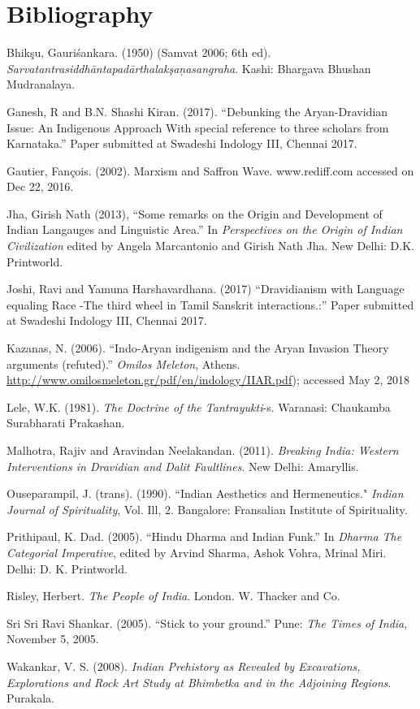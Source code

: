 \section*{Bibliography}

\begin{thebibliography}{99}
\itemsep=0pt
 Bhikşu, Gauriśankara. (1950) (Samvat 2006; 6th ed). \textit{Sarvatantrasiddhāntapadārthalakşaņasangraha}. Kashi: Bhargava Bhushan Mudranalaya.

  Ganesh, R and B.N. Shashi Kiran. (2017). “Debunking the Aryan-Dravidian Issue: An Indigenous Approach With special reference to three scholars from Karnataka.” Paper submitted at Swadeshi Indology III, Chennai 2017.

  Gautier, Fançois. (2002). Marxism and Saffron Wave. www.rediff.com accessed on Dec 22, 2016. 

  Jha, Girish Nath (2013), “Some remarks on the Origin and Development of Indian Langauges and Linguistic Area.” In \textit{Perspectives on the Origin of Indian Civilization} edited by Angela Marcantonio and Girish Nath Jha. New Delhi: D.K. Printworld.

  Joshi, Ravi and Yamuna Harshavardhana. (2017) “Dravidianism with Language equaling Race -The third wheel in Tamil Sanskrit interactions.:” Paper submitted at Swadeshi Indology III, Chennai 2017.

  Kazanas, N. (2006). “Indo-Aryan indigenism and the Aryan Invasion Theory arguments (refuted).” \textit{Omilos Meleton}, Athens. \url{http://www.omilosmeleton.gr/pdf/en/indology/IIAR.pdf}); accessed May 2, 2018

  Lele, W.K. (1981). \textit{The Doctrine of the Tantrayukti}-s. Waranasi: Chaukamba Surabharati Prakashan.

  Malhotra, Rajiv and Aravindan Neelakandan. (2011). \textit{Breaking India: Western Interventions in Dravidian and Dalit Faultlines}. New Delhi: Amaryllis.

  Ouseparampil, J. (trans). (1990). “Indian Aesthetics and Hermeneutics." \textit{Indian Journal of Spirituality}, Vol. Ill, 2. Bangalore: Fransalian Institute of Spirituality.

  Prithipaul, K. Dad. (2005). “Hindu Dharma and Indian Funk.” In \textit{Dharma The Categorial Imperative}, edited by Arvind Sharma, Ashok Vohra, Mrinal Miri. Delhi: D. K. Printworld.

  Risley, Herbert. \textit{The People of India}. London. W. Thacker and Co.

  Sri Sri Ravi Shankar. (2005). “Stick to your ground.” Pune: \textit{The Times of India}, November 5, 2005.

  Wakankar, V. S. (2008). \textit{Indian Prehistory as Revealed by Excavations, Explorations and Rock Art Study at Bhimbetka and in the Adjoining Regions}. Purakala. 

 \end{thebibliography}

